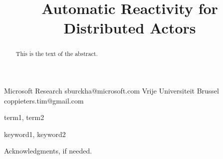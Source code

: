 \documentclass[preprint,numbers,10pt]{sigplanconf}
\begin{document}
\setlength{\pdfpageheight}{\paperheight}
\setlength{\pdfpagewidth}{\paperwidth}




\title{Automatic Reactivity for Distributed Actors}
\subtitle{}

           {Microsoft Research}
           {sburckha@microsoft.com}
           {Vrije Universiteit Brussel}
           {coppieters.tim@gmail.com}

\maketitle

\begin{abstract}
This is the text of the abstract.
\end{abstract}


\terms
term1, term2

\keywords
keyword1, keyword2








 

 

\acks

Acknowledgments, if needed.






\end{document}
